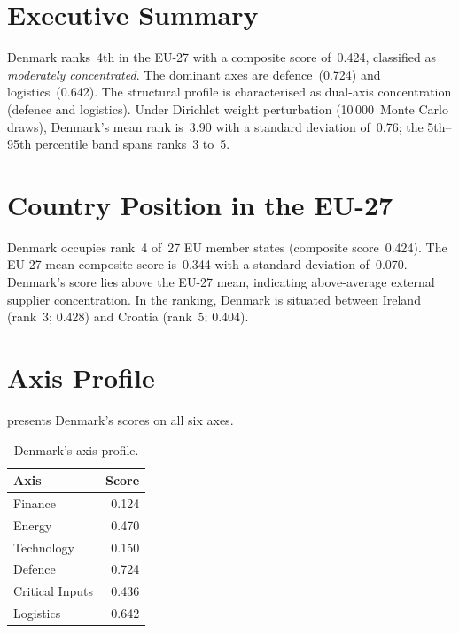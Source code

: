 \documentclass[12pt,a4paper]{article}
\begin{document}
\hypersetup{pageanchor=true}
\pagestyle{fancy}
\renewcommand{\headrulewidth}{0.4pt}


\section{Executive Summary}
\label{sec:summary}

Denmark ranks~4th in the EU-27 with a composite \ISI score of~0.424, classified as \emph{moderately concentrated}.  The dominant axes are defence~(0.724) and logistics~(0.642).  The structural profile is characterised as dual-axis concentration (defence and logistics).  Under Dirichlet weight perturbation (10\,000~Monte Carlo draws), Denmark's mean rank is~3.90 with a standard deviation of~0.76; the 5th--95th percentile band spans ranks~3 to~5.


\section{Country Position in the EU-27}
\label{sec:position}

Denmark occupies rank~4 of~27 EU member states (composite score~0.424).  The EU-27 mean composite score is~0.344 with a standard deviation of~0.070.  Denmark's score lies above the EU-27 mean, indicating above-average external supplier concentration.  In the ranking, Denmark is situated between Ireland (rank~3; 0.428) and Croatia (rank~5; 0.404).


\section{Axis Profile}
\label{sec:axis-profile}

 presents Denmark's scores on all six \ISI axes.

\begin{table}[htbp]
\centering\small
\caption{Denmark's \ISI axis profile.}
\label{tab:axis-profile}
\begin{tabular}{@{}lr@{}}
\toprule
\textbf{Axis} & \textbf{Score} \\
\midrule
    Finance           & 0.124 \\
    Energy            & 0.470 \\
    Technology        & 0.150 \\
    Defence           & 0.724 \\
    Critical Inputs   & 0.436 \\
    Logistics         & 0.642 \\
\bottomrule
\end{tabular}
\end{table}
\end{document}
